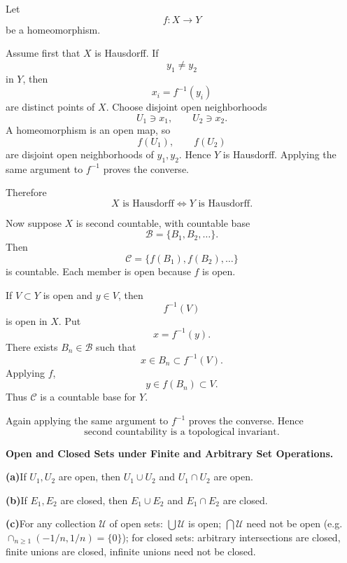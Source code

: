 \begin{solution}
Let
\[
f:X\to Y
\]
be a homeomorphism.

Assume first that \(X\) is Hausdorff. If
\[
y_1\neq y_2
\]
in \(Y\), then
\[
x_i=f^{-1}(y_i)
\]
are distinct points of \(X\). Choose disjoint open neighborhoods
\[
U_1\ni x_1,
\qquad
U_2\ni x_2.
\]
A homeomorphism is an open map, so
\[
f(U_1),\qquad f(U_2)
\]
are disjoint open neighborhoods of \(y_1,y_2\). Hence \(Y\) is Hausdorff. Applying the same argument to \(f^{-1}\) proves the converse.

Therefore
\[
\boxed{
X\text{ is Hausdorff}
\iff
Y\text{ is Hausdorff}.
}
\]

Now suppose \(X\) is second countable, with countable base
\[
\mathcal B=\{B_1,B_2,\ldots\}.
\]
Then
\[
\mathcal C=\{f(B_1),f(B_2),\ldots\}
\]
is countable. Each member is open because \(f\) is open.

If \(V\subset Y\) is open and \(y\in V\), then
\[
f^{-1}(V)
\]
is open in \(X\). Put
\[
x=f^{-1}(y).
\]
There exists \(B_n\in\mathcal B\) such that
\[
x\in B_n\subset f^{-1}(V).
\]
Applying \(f\),
\[
y\in f(B_n)\subset V.
\]
Thus \(\mathcal C\) is a countable base for \(Y\).

Again applying the same argument to \(f^{-1}\) proves the converse. Hence
\[
\boxed{
\text{second countability is a topological invariant}.
}
\]
\end{solution}


\begin{problem}[CP-II-0223]
\label{prob:cp-ii-0223}
\textbf{Open and Closed Sets under Finite and Arbitrary Set Operations.}

\par\smallskip\hspace*{1.5em}\textbf{(a)}\quad If $U_1,U_2$ are open, then $U_1\cup U_2$ and $U_1\cap U_2$ are open.
\par\smallskip\noindent\textbf{(b)}\quad If $E_1,E_2$ are closed, then $E_1\cup E_2$ and $E_1\cap E_2$ are closed.
\par\smallskip\noindent\textbf{(c)}\quad For any collection $\mathcal U$ of open sets: $\bigcup\mathcal U$ is open; $\bigcap\mathcal U$ need not be open (e.g.\ $\cap_{n\ge1}(-1/n,1/n)=\{0\}$);
for closed sets: arbitrary intersections are closed, finite unions are closed, infinite unions need not be closed.
\end{problem}

